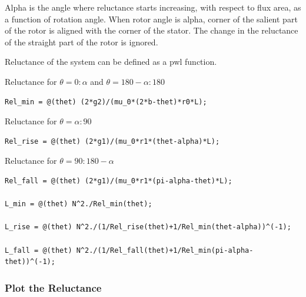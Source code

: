 \begin{par}
Alpha is the angle where reluctance starts increasing, with respect to flux area, as a function of rotation angle. When rotor angle is alpha, corner of the salient part of the rotor is aligned with the corner of the stator. The change in the reluctance of the straight part of the rotor is ignored.
\end{par} \vspace{1em}
\begin{par}
Reluctance of the system can be defined as a pwl function.
\end{par} \vspace{1em}
\begin{par}
Reluctance for $\theta = 0:\alpha$ and $\theta = 180-\alpha:180$
\end{par} \vspace{1em}
\begin{verbatim}
Rel_min = @(thet) (2*g2)/(mu_0*(2*b-thet)*r0*L);
\end{verbatim}
\begin{par}
Reluctance for $\theta = \alpha:90$
\end{par} \vspace{1em}
\begin{verbatim}
Rel_rise = @(thet) (2*g1)/(mu_0*r1*(thet-alpha)*L);
\end{verbatim}
\begin{par}
Reluctance for $\theta = 90:180-\alpha$
\end{par} \vspace{1em}
\begin{verbatim}
Rel_fall = @(thet) (2*g1)/(mu_0*r1*(pi-alpha-thet)*L);

L_min = @(thet) N^2./Rel_min(thet);

L_rise = @(thet) N^2./(1/Rel_rise(thet)+1/Rel_min(thet-alpha))^(-1);

L_fall = @(thet) N^2./(1/Rel_fall(thet)+1/Rel_min(pi-alpha-thet))^(-1);
\end{verbatim}


\subsubsection*{Plot the Reluctance}

